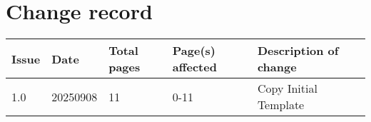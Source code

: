 
\section*{Change record}
\begin{table}[htp]
\centering
\renewcommand{\arraystretch}{1.2} %
\begin{tabularx}{\textwidth}{|l|l|l|l|X|}
\hline
Issue & Date & Total pages & Page(s) affected & Description of change \\
\hline
1.0 & 20250908 & 11 & 0-11 & Copy Initial Template \\
\hline
\end{tabularx}
\end{table}
